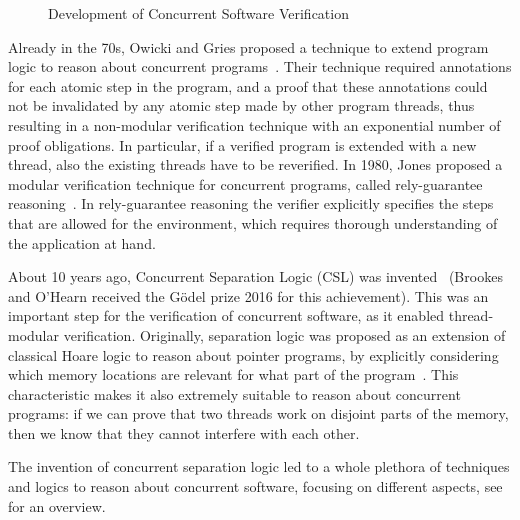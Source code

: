 \begin{figure}[t]
\caption{Development of Concurrent Software Verification}\label{fig:concurrent}
\end{figure}

Already in the 70s, Owicki and Gries proposed a technique to extend program logic to reason about concurrent programs~\cite{OwickiG75}. Their technique required annotations for each atomic step in the program, and a proof that these annotations could not be invalidated by any atomic step made by other program threads, thus resulting in a non-modular verification technique with an exponential number of proof obligations.  In particular, if a verified program is extended with a new thread, also the existing threads have to be reverified. In 1980, Jones proposed a modular verification technique for concurrent programs, called rely-guarantee reasoning~\cite{Jones83}. In rely-guarantee reasoning the verifier explicitly specifies the steps that are allowed for the environment, which requires thorough understanding of the application at hand.

About 10 years ago, Concurrent Separation Logic (CSL) was invented~\cite{OHearn07,Brookes07} (Brookes and O'Hearn received the G\"odel prize 2016 for this achievement).  This was an important step for the verification of concurrent software, as it enabled thread-modular verification. Originally, separation logic was proposed as an extension of classical Hoare logic to reason about pointer programs, by explicitly considering which memory locations are relevant for what part of the program~\cite{OHearnRY01,OHearnYR04}. This characteristic makes it also extremely suitable to reason about concurrent programs: if we can prove that two threads work on disjoint parts of the memory, then we know that they cannot interfere with each other. 

The invention of concurrent separation logic led to a whole plethora of techniques and logics to reason about concurrent software, focusing on different aspects, see~\cite{BrookesO16} for an overview. 

